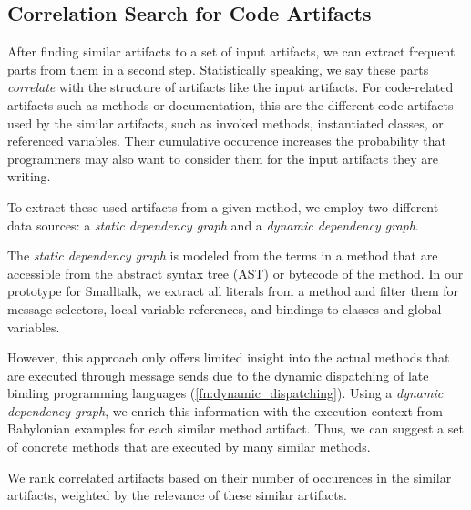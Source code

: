 \subsection{Correlation Search for Code Artifacts}
\label{sec:suggestions/search/correlations}

After finding similar artifacts to a set of input artifacts, we can extract frequent parts from them in a second step.
Statistically speaking, we say these parts \emph{correlate} with the structure of artifacts like the input artifacts.
For code-related artifacts such as methods or documentation, this are the different code artifacts used by the similar artifacts, such as invoked methods, instantiated classes, or referenced variables.
Their cumulative occurence increases the probability that programmers may also want to consider them for the input artifacts they are writing.

To extract these used artifacts from a given method, we employ two different data sources: a \emph{static dependency graph} and a \emph{dynamic dependency graph}.

The \emph{static dependency graph} is modeled from the terms in a method that are accessible from the abstract syntax tree (AST) or bytecode of the method.
In our prototype for Smalltalk, we extract all literals from a method and filter them for message selectors, local variable references, and bindings to classes and global variables.

However, this approach only offers limited insight into the actual methods that are executed through message sends due to the dynamic dispatching of late binding programming languages (\cref{fn:dynamic_dispatching}).
Using a \emph{dynamic dependency graph}, we enrich this information with the execution context from Babylonian examples for each similar method artifact.
Thus, we can suggest a set of concrete methods that are executed by many similar methods.

We rank correlated artifacts based on their number of occurences in the similar artifacts, weighted by the relevance of these similar artifacts.


